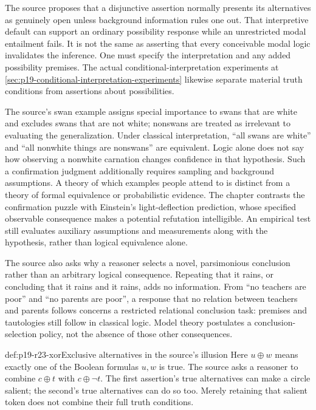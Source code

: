The source proposes that a disjunctive assertion normally presents its
alternatives as genuinely open unless background information rules one
out. That interpretive default can support an ordinary possibility
response while an unrestricted modal entailment fails. It is not the
same as asserting that every conceivable modal logic invalidates the
inference. One must specify the interpretation and any added possibility
premises. The actual conditional-interpretation experiments at
\cref{sec:p19-conditional-interpretation-experiments} likewise separate
material truth conditions from assertions about possibilities.

The source's swan example assigns special importance to swans that are
white and excludes swans that are not white; nonswans are treated as
irrelevant to evaluating the generalization. Under classical interpretation,
``all swans are white'' and ``all nonwhite things are nonswans'' are
equivalent. Logic alone does not say how observing a nonwhite carnation
changes confidence in that hypothesis. Such a confirmation judgment
additionally requires sampling and background assumptions. A theory of
which examples people attend to is distinct from a theory of formal
equivalence or probabilistic evidence.
The chapter contrasts the confirmation puzzle with Einstein's
light-deflection prediction, whose specified observable consequence
makes a potential refutation intelligible. An empirical test still
evaluates auxiliary assumptions and measurements along with the
hypothesis, rather than logical equivalence alone.

The source also asks why a reasoner selects a novel, parsimonious conclusion
rather than an arbitrary logical consequence. Repeating that it rains,
or concluding that it rains and it rains, adds no information. From
``no teachers are poor'' and ``no parents are poor'', a response that no
relation between teachers and parents follows concerns a restricted
relational conclusion task: premises and tautologies still follow in
classical logic. Model theory postulates a conclusion-selection policy,
not the absence of those other consequences.

\begin{hbdefinition}{def:p19-r23-xor}{Exclusive alternatives in the source's illusion}
Here \(u\mathbin{\oplus}w\) means exactly one of the Boolean formulas
\(u,w\) is true. The source asks a reasoner to combine
\(c\mathbin{\oplus}t\) with \(c\mathbin{\oplus}\neg t\).
The first assertion's true alternatives can make a circle salient; the
second's true alternatives can do so too. Merely retaining that salient
token does not combine their full truth conditions.
\end{hbdefinition}

